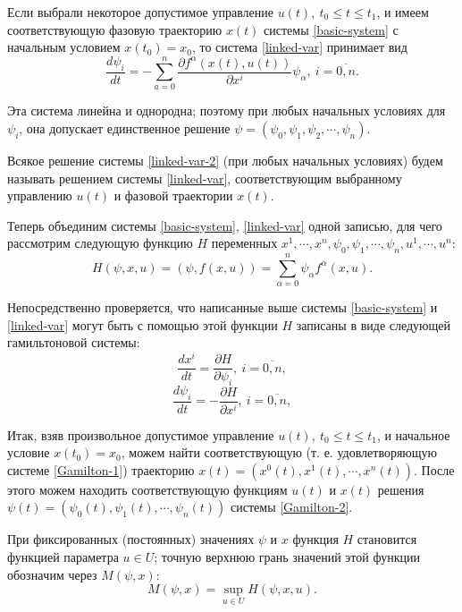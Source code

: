 \documentclass[14pt]{extreport}
\begin{document}
Если выбрали некоторое допустимое управление $u(t),\ t_0 \leq t \leq t_1$, и имеем соответствующую фазовую траекторию  $x(t)$ системы \eqref{basic-system} с начальным условием $x(t_0)=x_0$, то система \eqref{linked-var} принимает вид
\begin{equation}
\label{linked-var-2}
\dfrac{d\psi_i}{dt}=-\sum\limits_{a=0}^{n}\dfrac{\partial f^{\alpha}(x(t),u(t))}{\partial x^i}\psi_{\alpha},\ i=\overline{0,n}.
\end{equation}

Эта система линейна и однородна; поэтому при любых начальных условиях для $\psi_i$, она допускает единственное решение
$\psi=(\psi_0,\psi_1,\psi_2,\cdots,\psi_n)$.

Вся­кое решение системы \eqref{linked-var-2} (при любых начальных ус­ловиях) будем называть решением системы \eqref{linked-var}, соответствующим выбранному управлению $u(t)$ и фазо­вой траектории $x(t)$.

Теперь объединим системы \eqref{basic-system}, \eqref{linked-var} одной за­писью, для чего рассмотрим следующую функцию $H$ пе­ременных $x^1,\cdots,x^n,\psi_0,\psi_1,\cdots,\psi_n,u^1,\cdots,u^n$:
\begin{equation}
\label{func-H}
H(\psi,x,u)=(\psi,f(x,u))=\sum\limits_{\alpha=0}^{n} \psi_{\alpha} f^{\alpha} (x,u).
\end{equation}

Непосредственно проверяется, что написанные выше си­стемы \eqref{basic-system} и \eqref{linked-var} могут быть с помощью этой функции $H$ записаны в виде следующей гамильтоновой системы:
\begin{equation}
\label{Gamilton-1}
\dfrac{dx^i}{dt}=\dfrac{\partial H}{\partial \psi_i},\ i=\overline{0,n},
\end{equation}
\begin{equation}
\label{Gamilton-2}
\dfrac{d\psi_i}{dt}=-\dfrac{\partial H}{\partial x^i},\ i=\overline{0,n},
\end{equation}

Итак, взяв произвольное допустимое управление $u(t),\ t_0 \leq t \leq t_1 $, и начальное условие $x(t_0)=x_0$, можем найти соответствующую (т. е. удовлетворяющую системе \eqref{Gamilton-1}) траекторию $x(t)=(x^0(t),x^1(t),\cdots,x^n(t))$. После этого можем находить соответствующую функциям $u(t)$ и $x(t)$ ре­шения $\psi(t)=(\psi_0(t),\psi_1(t),\cdots,\psi_n(t))$ системы \eqref{Gamilton-2}.

При фиксированных (постоянных) значениях $\psi$ и $x$ функция $H$ становится функцией параметра $u \in U$; точ­ную верхнюю грань значений этой функции обозна­чим через $M(\psi,x)$:
\begin{equation}
\label{func-M}
M(\psi,x)=\sup\limits_{u\in U} H(\psi,x,u).
\end{equation}
\end{document}
